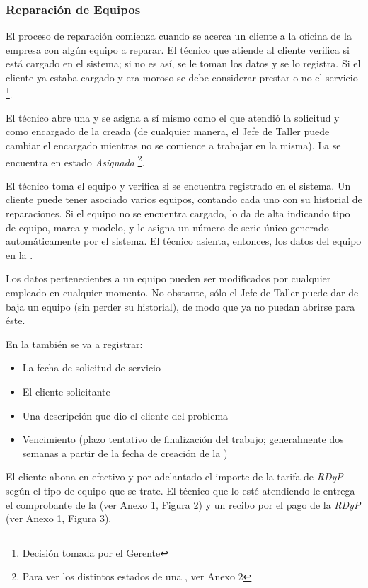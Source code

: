 \documentclass[12pt]{extarticle}
\begin{document}
\begin{spacing}{1.2}
    \subsubsection{Reparación de Equipos}
    El proceso de reparación comienza cuando se acerca un cliente a la oficina de la empresa con algún equipo a reparar. El técnico que atiende al cliente verifica si está cargado en el sistema; si no es así, se le toman los datos y se lo registra. Si el cliente ya estaba cargado y era moroso se debe considerar prestar o no el servicio \footnote{Decisión tomada por el Gerente}.
    
   El técnico abre una \OT{} y se asigna a sí mismo como el que atendió la solicitud y como encargado de la \OT{} creada (de cualquier manera, el Jefe de Taller puede cambiar el encargado mientras no se comience a trabajar en la misma). La \OT{} se encuentra en estado \textit{Asignada} \footnote{Para ver los distintos estados de una \OT{}, ver Anexo 2}. 

    El técnico toma el equipo y verifica si se encuentra registrado en el sistema. Un cliente puede tener asociado varios equipos, contando cada uno con su historial de reparaciones. Si el equipo no se encuentra cargado, lo da de alta indicando tipo de equipo, marca y modelo, y le asigna un número de serie único generado automáticamente por el sistema. El técnico asienta, entonces, los datos del equipo en la \OT{}.

    Los datos pertenecientes a un equipo pueden ser modificados por cualquier empleado en cualquier momento. No obstante, sólo el Jefe de Taller puede dar de baja un equipo (sin perder su historial), de modo que ya no puedan abrirse \OTs{} para éste.
   
    En la \OT{} también se va a registrar:
    \begin{itemize}
        \item La fecha de solicitud de servicio
        \item El cliente solicitante
        \item Una descripción que dio el cliente del problema
        \item Vencimiento (plazo tentativo de finalización del trabajo; generalmente dos semanas a partir de la fecha de creación de la \OT{})
    \end{itemize}

    El cliente abona en efectivo y por adelantado el importe de la tarifa de \textit{RDyP} según el tipo de equipo que se trate. El técnico que lo esté atendiendo le entrega el comprobante de la \OT{} (ver Anexo 1, Figura 2) y un recibo por el pago de la \textit{RDyP} (ver Anexo 1, Figura 3). 


\end{spacing}
\end{document}
